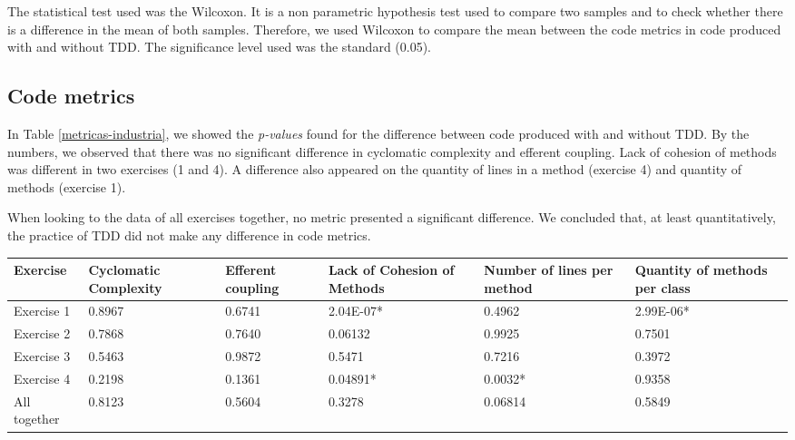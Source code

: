 \documentclass[conference]{IEEEtran}
\begin{document}
The statistical test used was the Wilcoxon. It is a non parametric hypothesis test
used to compare two samples and to check whether there is a difference in the mean
of both samples. Therefore, we used Wilcoxon to compare the mean between
the code metrics in code produced with and without TDD. The significance level
used was the standard (0.05).


\subsection{Code metrics}

In Table \ref{metricas-industria}, we showed the \textit{p-values} found for
the difference between code produced with and without TDD. By the numbers,
we observed that there was no significant difference in cyclomatic complexity
and efferent coupling.
Lack of cohesion of methods was different in two exercises (1 and 4). A difference
also appeared on the quantity of lines in a method (exercise 4) and quantity of
methods (exercise 1).

When looking to the data of all exercises together, no metric presented a significant
difference. We concluded that, at least quantitatively, the practice of TDD did not
make any difference in code metrics.

\begin{table*}
	\centering
	\begin{tabular}{ | p{3cm} | p{2cm} | p{2cm} | p{2cm} | p{2cm} | p{2cm} |}
		\hline
		\textbf{Exercise} & \textbf{Cyclomatic Complexity} & \textbf{Efferent coupling} & \textbf{Lack of Cohesion of Methods} & \textbf{Number of lines per method} 
		& \textbf{Quantity of methods per class} \\
		\hline
		Exercise 1 &	0.8967	&	0.6741 &	\cellcolor[gray]{0.8}2.04E-07* &	0.4962 &	\cellcolor[gray]{0.8}2.99E-06* \\
		Exercise 2	& 0.7868	&	0.7640 &	0.06132 &	0.9925 &	0.7501 \\
		Exercise 3	& 0.5463	&	0.9872 &	0.5471 &	0.7216 &	0.3972\\
		Exercise 4	& 0.2198	&	0.1361 &	\cellcolor[gray]{0.8}0.04891* &	\cellcolor[gray]{0.8}0.0032* &	0.9358\\
		\hline
		All together &	0.8123	&	0.5604 &	0.3278 &	0.06814 &	0.5849\\
		\hline
	\end{tabular}
	\caption{\textit{P-values} found for the difference between code produced with and without TDD}
	\label{metricas-industria}
\end{table*}
\end{document}
